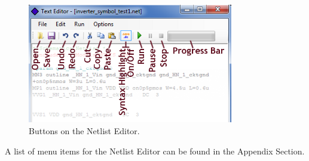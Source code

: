 \label{subsec_pane_netlisteditorguireference}

\begin{figure}[htb]
  \centering
    \includegraphics[width=0.8\textwidth]
		{./figures/appendix_buttons_menus_figures/NetlistEditor_AllButtons.png}
    \caption{Buttons on the Netlist Editor.}
  \label{fig_netlisteditor_allbuttons_inchapter}
\end{figure} 

A list of menu items for the Netlist Editor can be found in the Appendix Section.
